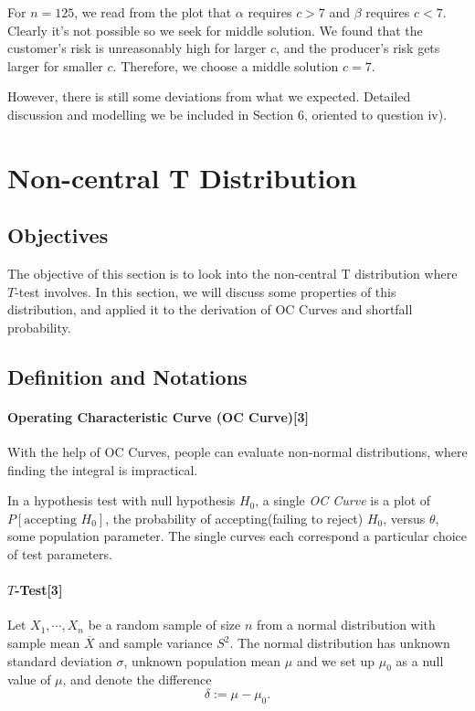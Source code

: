 \documentclass[a4paper]{article}
\begin{document}
For $n=125$, we read from the plot that $\alpha$ requires $c>7$ and $\beta$ requires $c<7$. Clearly it's not possible so we seek for middle solution. We found that the customer's risk is unreasonably high for larger $c$, and the producer's risk gets larger for smaller $c$. Therefore, we choose a middle solution $c=7$.

However, there is still some deviations from what we expected. Detailed discussion and modelling we be included in Section 6, oriented to question iv).
\section{Non-central T Distribution}
\subsection{Objectives}
The objective of this section is to look into the non-central T distribution where $T$-test involves. In this section, we will discuss some properties of this distribution, and applied it to the derivation of OC Curves and shortfall probability.

\subsection{Definition and Notations}
\paragraph{Operating Characteristic Curve (OC Curve)[3]}
With the help of OC Curves, people can evaluate non-normal distributions, where finding the integral is impractical.

In a hypothesis test with null hypothesis $H_0$, a single \textit{OC Curve} is a plot of $P[\text{accepting }H_0]$, the probability of accepting(failing to reject) $H_0$, versus $\theta$, some population parameter. The single curves each correspond a particular choice of test parameters.

\paragraph{$T$-Test[3]}
Let $X_1,\cdots,X_n$ be a random sample of size $n$ from a normal distribution with sample mean $\overline{X}$ and sample variance $S^2$. The normal distribution has unknown standard deviation $\sigma$, unknown population mean $\mu$ and we set up $\mu_0$ as a null value of $\mu$, and denote the difference 
$$\delta := \mu-\mu_0.$$
\end{document}
